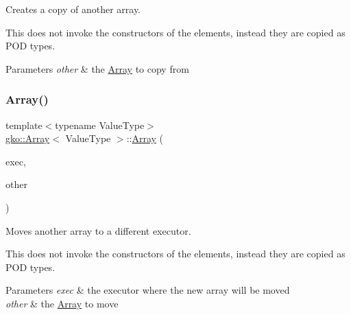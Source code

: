 Creates a copy of another array. 

This does not invoke the constructors of the elements, instead they are copied as P\+OD types.


\begin{DoxyParams}{Parameters}
{\em other} & the \hyperlink{classgko_1_1Array}{Array} to copy from \\
\hline
\end{DoxyParams}
\mbox{\label{classgko_1_1Array_a7e5b32002ac86e0534b91a4808212e28}} 
\subsubsection{\texorpdfstring{Array()}{Array()}\hspace{0.1cm}{\footnotesize\ttfamily [10/11]}}
{\footnotesize\ttfamily template$<$typename Value\+Type$>$ \\
\hyperlink{classgko_1_1Array}{gko\+::\+Array}$<$ Value\+Type $>$\+::\hyperlink{classgko_1_1Array}{Array} (\begin{DoxyParamCaption}\item[{std\+::shared\+\_\+ptr$<$ const \hyperlink{classgko_1_1Executor}{Executor} $>$}]{exec,  }\item[{\hyperlink{classgko_1_1Array}{Array}$<$ Value\+Type $>$ \&\&}]{other }\end{DoxyParamCaption})\hspace{0.3cm}{\ttfamily [inline]}}



Moves another array to a different executor. 

This does not invoke the constructors of the elements, instead they are copied as P\+OD types.


\begin{DoxyParams}{Parameters}
{\em exec} & the executor where the new array will be moved \\
\hline
{\em other} & the \hyperlink{classgko_1_1Array}{Array} to move \\
\hline
\end{DoxyParams}
\mbox{\label{classgko_1_1Array_a29da5ccbf776b7c85dbda0e8b4f20647}} 
